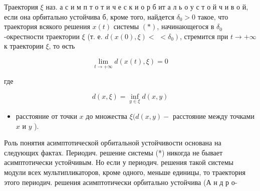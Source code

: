 \documentclass[10pt]{article}
\begin{document}
Траектория $\xi$ наз. а с и м п т о т и ч е с к и о р б ит а л ь о у с т о й ч и в о й, если она орбитально устойчива б, кроме того, найдется $\delta_{0}>0$ такое, что траектория всякого решения $x(t)$ системы $(*)$, начинающегося в $\delta_{0}$-окрестности траектории $\xi$ (т. е. $d(x(0), \xi)<$ $\left.<\delta_{0}\right)$, стремится при $t \rightarrow+\infty$ к траектории $\xi$, то өсть



\[

\lim _{t \rightarrow+\infty} d(x(t), \xi)=0

\]



где



\[

d(x, \xi)=\inf _{y \in \xi} d(x, y)

\]



\begin{itemize}

  \item расстояние от точки $x$ до множества $\xi(d(x, y)-$ расстояние между точками $x$ и $y$ ).

\end{itemize}



Роль понятия асимптотической орбитальной устойчивости основана на следующих фактах. Периодич. решение системы (*) никогда не бывает асимптотически устойчивым. Но если у периодич. решения такой системы модули всех мультипликаторов, кроме одного, меньше единицы, то траектория этого периодич. решения асимптотически орбитально устойчива (А н д р о-
\end{document}
